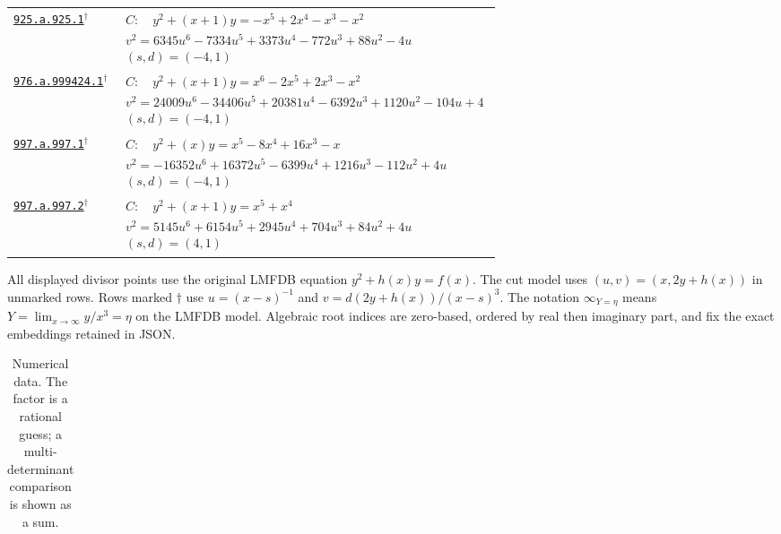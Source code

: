 \documentclass[10pt]{article}
\newcommand{\entryseparator}{\noalign{\vskip3pt\hbox to\linewidth{\leaders\hbox{\kern2pt\rule{3pt}{0.3pt}\kern2pt}\hfill}\nobreak\vskip3pt\nobreak}}
\begin{document}
\begin{landscape}
\begin{longtable}{@{}p{3.4cm}p{\dimexpr\linewidth-3.4cm-2\tabcolsep\relax}@{}}
\entryseparator
\href{https://www.lmfdb.org/Genus2Curve/Q/925/a/925/1}{\texttt{925.a.925.1}}$^{\dagger}$ & $\begin{gathered}C:\quad y^2+\left(x + 1\right)y=-x^{5} + 2 x^{4} - x^{3} - x^{2}\\v^2=6345 u^{6} - 7334 u^{5} + 3373 u^{4} - 772 u^{3} + 88 u^{2} - 4 u\\(s,d)=(-4,1)\end{gathered}$ \\
\entryseparator
\href{https://www.lmfdb.org/Genus2Curve/Q/976/a/999424/1}{\texttt{976.a.999424.1}}$^{\dagger}$ & $\begin{gathered}C:\quad y^2+\left(x + 1\right)y=x^{6} - 2 x^{5} + 2 x^{3} - x^{2}\\v^2=24009 u^{6} - 34406 u^{5} + 20381 u^{4} - 6392 u^{3} + 1120 u^{2} - 104 u + 4\\(s,d)=(-4,1)\end{gathered}$ \\
\entryseparator
\href{https://www.lmfdb.org/Genus2Curve/Q/997/a/997/1}{\texttt{997.a.997.1}}$^{\dagger}$ & $\begin{gathered}C:\quad y^2+\left(x\right)y=x^{5} - 8 x^{4} + 16 x^{3} - x\\v^2=-16352 u^{6} + 16372 u^{5} - 6399 u^{4} + 1216 u^{3} - 112 u^{2} + 4 u\\(s,d)=(-4,1)\end{gathered}$ \\
\entryseparator
\href{https://www.lmfdb.org/Genus2Curve/Q/997/a/997/2}{\texttt{997.a.997.2}}$^{\dagger}$ & $\begin{gathered}C:\quad y^2+\left(x + 1\right)y=x^{5} + x^{4}\\v^2=5145 u^{6} + 6154 u^{5} + 2945 u^{4} + 704 u^{3} + 84 u^{2} + 4 u\\(s,d)=(4,1)\end{gathered}$ \\
\end{longtable}
\noindent All displayed divisor points use the original LMFDB equation $y^2+h(x)y=f(x)$.
The cut model uses $(u,v)=(x,2y+h(x))$ in unmarked rows.
Rows marked $\dagger$ use $u=(x-s)^{-1}$ and $v=d(2y+h(x))/(x-s)^3$.
The notation $\infty_{Y=\eta}$ means $Y=\lim_{x\to\infty}y/x^3=\eta$ on the LMFDB model. Algebraic root indices are zero-based,
ordered by real then imaginary part, and fix the exact embeddings retained in JSON.
\clearpage
\begin{longtable}{@{}lrrrrrr@{}}
\caption{Numerical data. The factor is a rational guess; a multi-determinant comparison is shown as a sum.}\label{tab:data}\\

\end{longtable}
\end{landscape}
\end{document}
